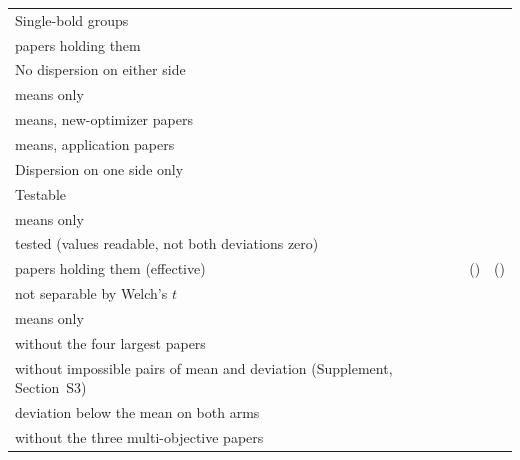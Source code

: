 \documentclass[preprint,review,12pt]{elsarticle}
\begin{document}
\begin{table}[t]
{\begin{tabular}{@{}lrr@{}}
Single-bold groups & \nCrAllGroups{} & \nCrcAllGroups{} \\
\quad papers holding them & \nCrAllPapers{} & \nCrcAllPapers{} \\
No dispersion on either side & \nCrAllNeither{} \nCrAllNeitherCi{} & \nCrcAllNeither{} \nCrcAllNeitherCi{} \\
\quad means only & \nCrMeansNeither{} \nCrMeansNeitherCi{} & \nCrcMeansNeither{} \nCrcMeansNeitherCi{} \\
\quad means, new-optimizer papers & \nCrMeansNewOptimizerNeither{} \nCrMeansNewOptimizerNeitherCi{} & \nCrcMeansNewOptimizerNeither{} \nCrcMeansNewOptimizerNeitherCi{} \\
\quad means, application papers & \nCrMeansApplicationNeither{} \nCrMeansApplicationNeitherCi{} & \nCrcMeansApplicationNeither{} \nCrcMeansApplicationNeitherCi{} \\
Dispersion on one side only & \nCrAllOneSide{} & \nCrcAllOneSide{} \\
Testable & \nCrAllTestable{} \nCrAllTestableCi{} & \nCrcAllTestable{} \nCrcAllTestableCi{} \\
\quad means only & \nCrMeansTestable{} & \nCrcMeansTestable{} \\
\quad tested (values readable, not both deviations zero) & \nCrAllTested{} & \nCrcAllTested{} \\
\quad papers holding them (effective) & \nCrAllTestedPapers{} (\nCrAllTestedEffective{}) & \nCrcAllTestedPapers{} (\nCrcAllTestedEffective{}) \\
\quad not separable by Welch's $t$ & \nCrAllFail{} \nCrAllFailCi{} & \nCrcAllFail{} \nCrcAllFailCi{} \\
\quad \quad means only & \nCrMeansFail{} \nCrMeansFailCi{} & \nCrcMeansFail{} \nCrcMeansFailCi{} \\
\quad \quad without the four largest papers & \nCrPpWithoutTopFourFail{} \nCrPpWithoutTopFourFailCi{} & \nCrcPpWithoutTopFourFail{} \nCrcPpWithoutTopFourFailCi{} \\
\quad \quad without impossible pairs of mean and deviation (Supplement, Section~S3) & \nCrAlWithoutImpossibleFail{} & \nCrcAlWithoutImpossibleFail{} \\
\quad \quad deviation below the mean on both arms & \nCrShSdLtMeanFail{} \nCrShSdLtMeanFailCi{} & \nCrcShSdLtMeanFail{} \nCrcShSdLtMeanFailCi{} \\
\quad \quad without the three multi-objective papers & \nCrPpWithoutTopThreeFail{} \nCrPpWithoutTopThreeFailCi{} & \nCrcPpWithoutTopThreeFail{} \nCrcPpWithoutTopThreeFailCi{} \\

\end{tabular}}
\end{table}
\end{document}
